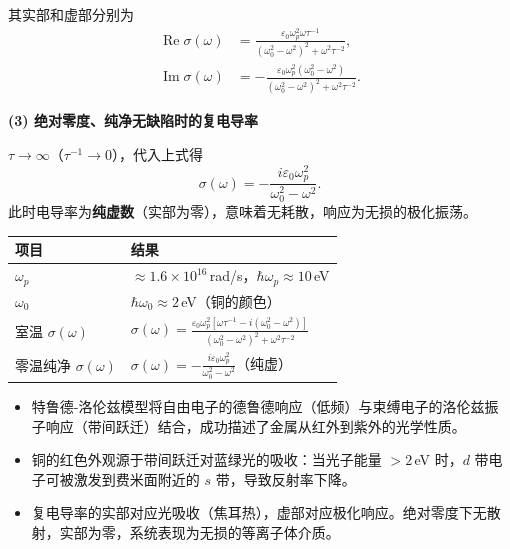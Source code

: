 \begin{derivationbox}[标准解题过程]
其实部和虚部分别为
\begin{align}
\operatorname{Re}\sigma(\omega)&=\frac{\varepsilon_0\omega_p^2\omega\tau^{-1}}{(\omega_0^2-\omega^2)^2+\omega^2\tau^{-2}},\\
\operatorname{Im}\sigma(\omega)&=-\frac{\varepsilon_0\omega_p^2(\omega_0^2-\omega^2)}{(\omega_0^2-\omega^2)^2+\omega^2\tau^{-2}}.
\end{align}

\textbf{(3) 绝对零度、纯净无缺陷时的复电导率}

$\tau\to\infty$（$\tau^{-1}\to0$），代入上式得
\begin{equation}
\boxed{\sigma(\omega)=-\frac{i\varepsilon_0\omega_p^2}{\omega_0^2-\omega^2}.}
\end{equation}
此时电导率为\textbf{纯虚数}（实部为零），意味着无耗散，响应为无损的极化振荡。
\end{derivationbox}

\begin{formulabox}[答案汇总]
\begin{center}
\begin{tabular}{ll}
\toprule
\textbf{项目} & \textbf{结果} \\
\midrule
$\omega_p$ & $\approx1.6\times10^{16}\,$rad/s，$\hbar\omega_p\approx10\,$eV \\
$\omega_0$ & $\hbar\omega_0\approx2\,$eV（铜的颜色） \\
室温 $\sigma(\omega)$ & $\displaystyle\sigma(\omega)=\frac{\varepsilon_0\omega_p^2[\omega\tau^{-1}-i(\omega_0^2-\omega^2)]}{(\omega_0^2-\omega^2)^2+\omega^2\tau^{-2}}$ \\
零温纯净 $\sigma(\omega)$ & $\displaystyle\sigma(\omega)=-\frac{i\varepsilon_0\omega_p^2}{\omega_0^2-\omega^2}$（纯虚） \\
\bottomrule
\end{tabular}
\end{center}
\end{formulabox}

\begin{insightbox}[物理图像]
\begin{itemize}
    \item 特鲁德-洛伦兹模型将自由电子的德鲁德响应（低频）与束缚电子的洛伦兹振子响应（带间跃迁）结合，成功描述了金属从红外到紫外的光学性质。
    \item 铜的红色外观源于带间跃迁对蓝绿光的吸收：当光子能量 $>2\,$eV 时，$d$ 带电子可被激发到费米面附近的 $s$ 带，导致反射率下降。
    \item 复电导率的实部对应光吸收（焦耳热），虚部对应极化响应。绝对零度下无散射，实部为零，系统表现为无损的等离子体介质。
\end{itemize}
\end{insightbox}
